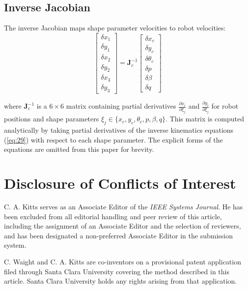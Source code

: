 \documentclass[lettersize,journal]{IEEEtran}
\begin{document}
\subsection{Inverse Jacobian}

The inverse Jacobian maps shape parameter velocities to robot velocities:
\begin{equation}\label{eq:30}
\begin{bmatrix}
\delta x_1 \\ \delta y_1 \\ \delta x_2 \\ \delta y_2 \\ \delta x_3 \\ \delta y_3
\end{bmatrix} =
\mathbf{J}_c^{-1}
\begin{bmatrix}
\delta x_c \\ \delta y_c \\ \delta \theta_c \\ \delta p \\ \delta \beta \\ \delta q
\end{bmatrix}
\end{equation}

where $\mathbf{J}_c^{-1}$ is a $6 \times 6$ matrix containing partial derivatives $\frac{\partial x_i}{\partial \xi_j}$ and $\frac{\partial y_i}{\partial \xi_j}$ for robot positions and shape parameters $\xi_j \in \{x_c, y_c, \theta_c, p, \beta, q\}$. This matrix is computed analytically by taking partial derivatives of the inverse kinematics equations (\ref{eq:29}) with respect to each shape parameter. The explicit forms of the equations are omitted from this paper for brevity.


\section*{Disclosure of Conflicts of Interest}

C. A. Kitts serves as an Associate Editor of the \textit{IEEE Systems Journal}. He has been excluded from all editorial handling and peer review of this article, including the assignment of an Associate Editor and the selection of reviewers, and has been designated a non-preferred Associate Editor in the submission system.

C. Waight and C. A. Kitts are co-inventors on a provisional patent application filed through Santa Clara University covering the method described in this article. Santa Clara University holds any rights arising from that application.
\end{document}
